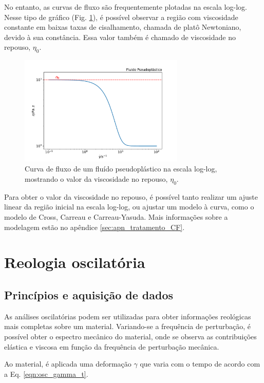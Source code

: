 			No entanto, as curvas de fluxo são frequentemente plotadas na escala log-log. Nesse tipo de gráfico (Fig. \ref{fig:reol_pseudoplastico_loglog}), é possível observar a região com viscosidade constante em baixas taxas de cisalhamento, chamada de platô Newtoniano, devido à sua constância. Essa valor também é chamado de viscosidade no repouso, \(\eta_0\).
			
			\begin{figure}[H]
				\centering
				\includegraphics[width=0.7\textwidth]{./imagens/reologia/Pseudoplastico_loglog}
				\caption{Curva de fluxo de um fluído pseudoplástico na escala log-log, mostrando o valor da viscosidade no repouso, \(\eta_0\).}
				\label{fig:reol_pseudoplastico_loglog}
			\end{figure}
		
			Para obter o valor da viscosidade no repouso, é possível tanto realizar um ajuste linear da região inicial na escala log-log, ou ajustar um modelo à curva, como o modelo de Cross, Carreau e Carreau-Yasuda. Mais informações sobre a modelagem estão no apêndice \ref{sec:apn_tratamento_CF}.

		\section{Reologia oscilatória}
			\subsection{Princípios e aquisição de dados}
			
			As análises oscilatórias podem ser utilizadas para obter informações reológicas mais completas sobre um material. Variando-se a frequência de perturbação, é possível obter o espectro mecânico do material, onde se observa as contribuições elástica e viscosa em função da frequência de perturbação mecânica.
			
			Ao material, é aplicada uma deformação \(\gamma\) que varia com o tempo de acordo com a Eq. \ref{eqn:osc_gamma_t}.
			

